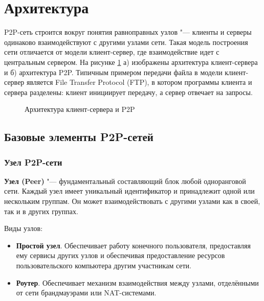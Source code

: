 \documentclass[bachelor, och, coursework]{SCWorks}
\begin{document}
\section{Архитектура} 
P2P-сеть строится вокруг понятия равноправных узлов "--- клиенты и серверы одинаково взаимодействуют с другими узлами сети. 
Такая модель построения сети отличается от модели клиент-сервер, где взаимодействие идет с центральным сервером. 
На рисунке \ref{image1} а) изображены архитектура клиент-сервера и б) архитектура P2P. 
Типичным примером передачи файла в модели клиент-сервер является File Transfer Protocol (FTP), 
в котором программы клиента и сервера разделены: клиент инициирует передачу, а сервер отвечает на запросы. 

\begin{figure}[h]
    \begin{minipage}[h]{0.49\linewidth}
    \end{minipage}
    \hfill
    \begin{minipage}[h]{0.49\linewidth}
    \end{minipage}
    \caption{Архитектура клиент-сервера и P2P}
    \label{image1}
\end{figure}

\subsection{Базовые элементы P2P-сетей}
\subsubsection{Узел P2P-сети}
\textbf{Узел (Peer)} "--- фундаментальный составляющий блок любой одноранговой сети. 
Каждый узел имеет уникальный идентификатор и принадлежит одной или нескольким группам. 
Он может взаимодействовать с другими узлами как в своей, так и в других группах. \cite{P2P_2}

Виды узлов:
\begin{itemize}
    \item \textbf{Простой узел}. Обеспечивает работу конечного пользователя, предоставляя ему сервисы других узлов и	
    обеспечивая предоставление ресурсов пользовательского компьютера другим	участникам сети.
    \item \textbf{Роутер}. Обеспечивает механизм взаимодействия между узлами, отделёнными от сети брандмауэрами или NAT-системами.	
\end{itemize}
\end{document}
